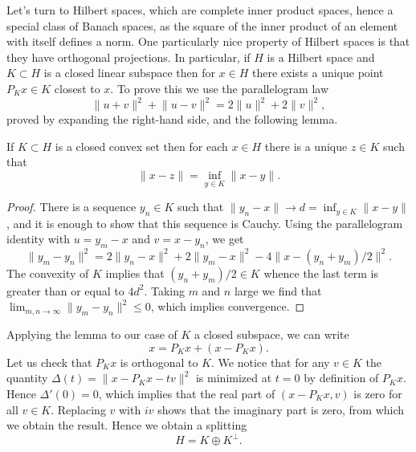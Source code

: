 \documentclass{amsart}
\begin{document}
Let's turn to Hilbert spaces, which are complete inner product spaces,
hence a special class of Banach spaces, as the square of the inner product
of an element with itself defines a norm. One particularly nice property
of Hilbert spaces is that they have orthogonal projections. In particular,
if $H$ is a Hilbert space and $K\subset H$ is a closed linear subspace then
for $x\in H$ there exists a unique point $P_Kx\in K$ closest to $x$. To
prove this we use the parallelogram law
\begin{equation*}
    \lVert u+v\rVert^2 + \lVert u-v\rVert^2 = 2\lVert u\rVert^2 + 2\lVert v\rVert^2,
\end{equation*}
proved by expanding the right-hand side, and the following lemma.
\begin{lemma}
    If $K\subset H$ is a closed convex set then for each $x\in H$
    there is a unique $z\in K$ such that
    \begin{equation*}
        \lVert x-z\rVert = \inf_{y\in K}\lVert x-y\rVert.
    \end{equation*}
\end{lemma}
\begin{proof}
    There is a sequence $y_n\in K$ such that
    $\lVert y_n-x\rVert\to d=\inf_{y\in K}\lVert x-y\rVert$, and it is
    enough to show that this sequence is Cauchy. Using the parallelogram
    identity with $u=y_m-x$ and $v=x-y_n$, we get
    \begin{equation*}
        \lVert y_m-y_n\rVert^2 = 2\lVert y_n-x\rVert^2 + 2\lVert y_m-x\rVert^2
        - 4\lVert x-(y_n+y_m)/2\rVert^2.
    \end{equation*}
    The convexity of $K$ implies that $(y_n+y_m)/2\in K$ whence the last
    term is greater than or equal to $4d^2.$ Taking $m$ and $n$ large
    we find that $\lim_{m,n\to\infty}\lVert y_m-y_n\rVert^2\leqslant0$,
    which implies convergence.
\end{proof}
Applying the lemma to our case of $K$ a closed subspace, we can write
\begin{equation*}
    x = P_Kx + (x-P_Kx).
\end{equation*}
Let us check that $P_Kx$ is orthogonal to $K$. We notice that for any
$v\in K$ the quantity $\Delta(t) = \lVert x-P_Kx-tv\rVert^2$ is
minimized at $t=0$ by definition of $P_Kx$. Hence $\Delta'(0)=0$,
which implies that the real part of $(x-P_Kx, v)$ is zero for all
$v\in K$. Replacing $v$ with $iv$ shows that the imaginary part is zero,
from which we obtain the result. Hence we obtain a splitting
\begin{equation*}
    H = K\oplus K^\perp.
\end{equation*}
\end{document}
